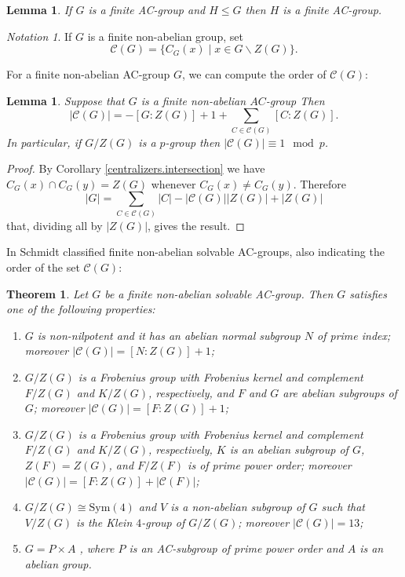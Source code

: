\documentclass[12pt]{amsart}
\theoremstyle{definition}
\theoremstyle{remark}
\theoremstyle{plain}
\theoremstyle{plain}
\theoremstyle{plain}
\theoremstyle{plain}
\newtheorem{lemma}[definition]{Lemma}
\theoremstyle{plain}
\newtheorem{theorem}[definition]{Theorem}
\theoremstyle{remark}
\theoremstyle{remark}
\newtheorem{notation}[definition]{Notation}
\theoremstyle{definition}
\newcommand{\Sym}{\mathrm{Sym}}
\begin{document}
\begin{lemma}\cite[Remark 3.3(c)]{Rocke}
If $G$ is a finite AC-group and $H\leq G$ then $H$ is a finite AC-group.
\end{lemma}

\begin{notation}
If $G$ is a finite non-abelian group, set $$\mathcal{C}(G) = \{C_G(x) \mid x \in G \backslash Z(G)\}.$$ 
\end{notation}

For a finite non-abelian AC-group $G$, we can compute the order of $\mathcal{C}(G)$:

\begin{lemma}\label{clique}
Suppose that $G$ is a finite non-abelian $AC$-group 
Then 
\[|\mathcal{C}(G)| =  -[G \colon Z(G)] + 1 + \sum_{C \in \mathcal{C}(G)}[C \colon Z(G)].\] 
In particular, if $G/Z(G)$ is a $p$-group then $|\mathcal{C}(G)|  \equiv 1 \mod p$.
\end{lemma}

\begin{proof}
By Corollary \ref{centralizers.intersection} we have $C_G(x) \cap C_G(y) = Z(G)$ whenever $C_G(x) \neq C_G(y)$. Therefore
\[ |G| = \sum_{C \in \mathcal{C}(G)}|C| - |\mathcal{C}(G)||Z(G)| + |Z(G)|\]
that, dividing all by $|Z(G)|$, gives the result.
\end{proof}


In \cite[Satz 5.12]{Schmidt1970} Schmidt classified finite non-abelian solvable AC-groups, also indicating the order of the set $\mathcal{C}(G)$: 

\begin{theorem}\label{classification} Let $G$ be a finite non-abelian solvable AC-group. Then $G$ satisfies one of the following properties:
\begin{enumerate}
    \item $G$ is non-nilpotent and it has an abelian normal subgroup $N$ of prime index; moreover $|\mathcal{C}(G)| = [N \colon Z(G)] + 1$;
 
 \item $G/Z(G)$ is a Frobenius group with Frobenius kernel and complement $F/Z(G)$ and $K/Z(G)$, respectively, and $F$ and $G$ are abelian subgroups of $G$; moreover $|\mathcal{C}(G)| = [F \colon Z(G)] + 1$;
 
 \item $G/Z(G)$ is a Frobenius group with Frobenius kernel and complement $F/Z(G)$ and
$K/Z(G)$, respectively, $K$ is an abelian subgroup of $G$, $Z(F) = Z(G)$, and $F/Z(F)$ is of prime power order; moreover $|\mathcal{C}(G)| = [F \colon Z(G)] + |\mathcal{C}(F)|$;
    

\item $G/Z(G) \cong \Sym(4)$ and $V$ is a non-abelian subgroup of $G$ such that $V/Z(G)$ is the Klein $4$-group of $G/Z(G)$; moreover $|\mathcal{C}(G)| = 13$;

\item $G = P \times A$ , where $P$ is an AC-subgroup of prime power order and $A$ is an abelian group. 

\end{enumerate}

\end{theorem}
\end{document}
